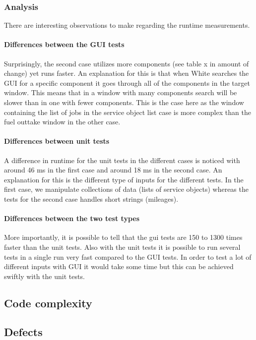 \documentclass{article}
\begin{document}
			\subsubsection{Analysis}
			There are interesting observations to make regarding the runtime measurements. 

			\paragraph{Differences between the GUI tests}
			Surprisingly, the second case utilizes more components (see table x in amount of change) yet runs faster. An explanation for this is that when White searches the GUI for a specific component it goes through all of the components in the target window. This means that in a window with many components search will be slower than in one with fewer components. This is the case here as the window containing the list of jobs in the service object list case is more complex than the fuel outtake window in the other case.

			\paragraph{Differences between unit tests}
			A difference in runtime for the unit tests in the different cases is noticed with around 46 ms in the first case and around 18 ms in the second case. An explanation for this is the different type of inputs for the different tests. In the first case, we manipulate collections of data (lists of service objects) whereas the tests for the second case handles short strings (mileages).

			\paragraph{Differences between the two test types}			
			More importantly, it is possible to tell that the gui tests are 150 to 1300 times faster than the unit tests. Also with the unit tests it is possible to run several tests in a single run very fast compared to the GUI tests. In order to test a lot of different inputs with GUI it would take some time but this can be achieved swiftly with the unit tests.

		\subsection{Code complexity}
		
		\subsection{Defects}	
\end{document}
